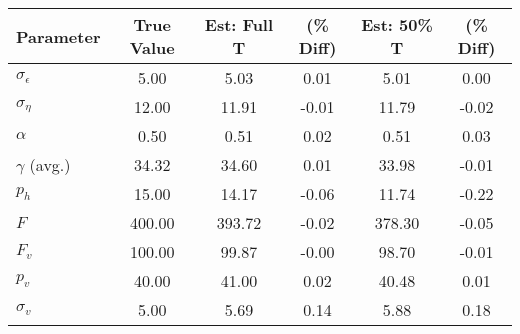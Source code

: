 \begin{tabular}{lccccc}

Parameter & True Value & Est: Full T & (\% Diff)  & Est: 50\% T & (\% Diff) \\
\hline
\hline
$\sigma_{\epsilon}$&5.00&5.03&0.01&5.01&0.00\\
$\sigma_{\eta}$&12.00&11.91&-0.01&11.79&-0.02\\
$\alpha$&0.50&0.51&0.02&0.51&0.03\\
$\gamma$ (avg.)&34.32&34.60&0.01&33.98&-0.01\\
$p_h$&15.00&14.17&-0.06&11.74&-0.22\\
$F$&400.00&393.72&-0.02&378.30&-0.05\\
$F_v$&100.00&99.87&-0.00&98.70&-0.01\\
$p_v$&40.00&41.00&0.02&40.48&0.01\\
$\sigma_v$&5.00&5.69&0.14&5.88&0.18\\
\hline
\end{tabular}
